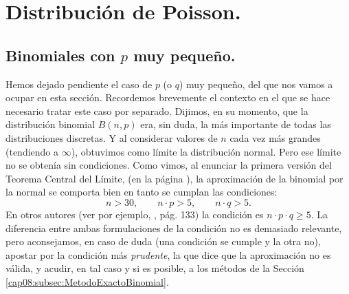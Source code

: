 

\section{Distribución de Poisson.}
\label{cap08:sec:DistribucionPoisson}

\subsection{Binomiales con $p$ muy pequeño.}
\label{cap08:subsec:BinomialesPMuyPequenno}

Hemos dejado pendiente el caso de $p$ (o $q$) muy pequeño, del que nos vamos a ocupar en esta
sección. Recordemos brevemente el contexto en el que se hace necesario tratar este caso por
separado. Dijimos, en su momento, que la distribución binomial $B(n,p)$ era, sin duda, la más
importante de todas las distribuciones discretas. Y al considerar valores de $n$ cada vez más
grandes (tendiendo a $\infty$), obtuvimos como límite la distribución normal. Pero ese límite no se
obtenía sin condiciones. Como vimos, al enunciar la primera versión del Teorema Central del Límite,
(en la página \pageref{sec:teoremaCentralLimitePrimeraVersion}), la aproximación de la binomial por
la normal se comporta bien en tanto se cumplan las condiciones:
         \[n>30,\qquad n\cdot p>5,\qquad n\cdot q>5.\]
En otros autores (ver por ejemplo, \cite{rosner2011fundamentals}, pág. 133) la condición es $n\cdot p \cdot q\geq 5$. La diferencia entre ambas formulaciones de la condición no es demasiado relevante, pero
aconsejamos, en caso de duda (una condición se cumple y la otra no), apostar por la condición más
{\em prudente}, la que dice que la aproximación no es válida, y acudir, en tal caso y si es posible, a los métodos de la Sección \ref{cap08:subsec:MetodoExactoBinomial}.

